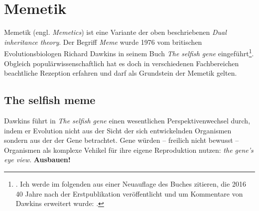 \documentclass[openany,twoside,twocolumn]{book}
\let\rmarkdownfootnote\footnote%
\def\footnote{\protect\rmarkdownfootnote}
\begin{document}
\hypertarget{memetik}{%
\section{Memetik}\label{memetik}}

Memetik (engl. \emph{Memetics}) ist eine Variante der oben beschriebenen
\emph{Dual inheritance theory}. Der Begriff \emph{Meme} wurde 1976 vom
britischen Evolutionsbiologen Richard Dawkins in seinem Buch \emph{The
selfish gene} eingeführt\footnote{\textcite{Dawkinsselfishgene1976}. Ich
  werde im folgenden aus einer Neuauflage des Buches zitieren, die 2016
  40 Jahre nach der Erstpublikation veröffentlicht und um Kommentare von
  Dawkins erweitert wurde: \textcite{Dawkinsselfishgene40th2016}.}.
Obgleich populärwissenschaftlich hat es doch in verschiedenen
Fachbereichen beachtliche Rezeption erfahren und darf als Grundstein der
Memetik gelten.

\hypertarget{the-selfish-meme}{%
\subsection{The selfish meme}\label{the-selfish-meme}}

Dawkins führt in \emph{The selfish gene} einen wesentlichen
Perspektivenwechsel durch, indem er Evolution nicht aus der Sicht der
sich entwickelnden Organismen sondern aus der der Gene betrachtet. Gene
würden -- freilich nicht bewusst -- Organismen als komplexe Vehikel für
ihre eigene Reproduktion nutzen: \emph{the gene's eye view}.
\textbf{Ausbauen!}
\end{document}

